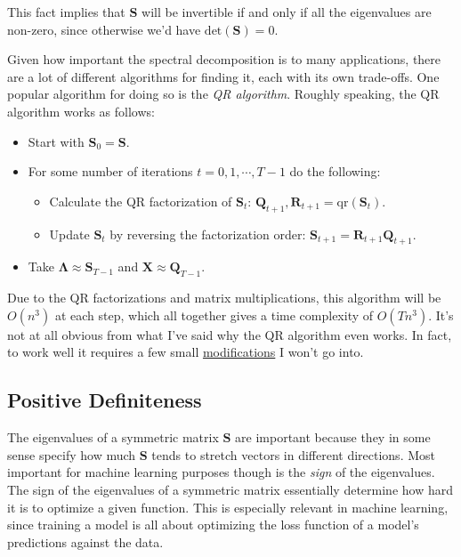 \documentclass[
  letterpaper,
  DIV=11,
  numbers=noendperiod]{scrreprt}
\providecommand{\tightlist}{%
  \setlength{\itemsep}{0pt}\setlength{\parskip}{0pt}}\usepackage{longtable,booktabs,array}
\begin{document}
This fact implies that \(\mathbf{S}\) will be invertible if and only if
all the eigenvalues are non-zero, since otherwise we'd have
\(\text{det}(\mathbf{S})=0\).

Given how important the spectral decomposition is to many applications,
there are a lot of different algorithms for finding it, each with its
own trade-offs. One popular algorithm for doing so is the \emph{QR
algorithm}. Roughly speaking, the QR algorithm works as follows:

\begin{itemize}
\tightlist
\item
  Start with \(\mathbf{S}_0 = \mathbf{S}\).
\item
  For some number of iterations \(t=0,1,\cdots, T-1\) do the following:

  \begin{itemize}
  \tightlist
  \item
    Calculate the QR factorization of \(\mathbf{S}_t\):
    \(\mathbf{Q}_{t+1}, \mathbf{R}_{t+1} = \text{qr}(\mathbf{S}_t)\).
  \item
    Update \(\mathbf{S}_t\) by reversing the factorization order:
    \(\mathbf{S}_{t+1} = \mathbf{R}_{t+1} \mathbf{Q}_{t+1}\).
  \end{itemize}
\item
  Take \(\mathbf{\Lambda} \approx \mathbf{S}_{T-1}\) and
  \(\mathbf{X} \approx \mathbf{Q}_{T-1}\).
\end{itemize}

Due to the QR factorizations and matrix multiplications, this algorithm
will be \(O(n^3)\) at each step, which all together gives a time
complexity of \(O(Tn^3)\). It's not at all obvious from what I've said
why the QR algorithm even works. In fact, to work well it requires a few
small \href{https://en.wikipedia.org/wiki/QR_algorithm}{modifications} I
won't go into.

\hypertarget{positive-definiteness}{%
\subsection{Positive Definiteness}\label{positive-definiteness}}

The eigenvalues of a symmetric matrix \(\mathbf{S}\) are important
because they in some sense specify how much \(\mathbf{S}\) tends to
stretch vectors in different directions. Most important for machine
learning purposes though is the \emph{sign} of the eigenvalues. The sign
of the eigenvalues of a symmetric matrix essentially determine how hard
it is to optimize a given function. This is especially relevant in
machine learning, since training a model is all about optimizing the
loss function of a model's predictions against the data.
\end{document}

